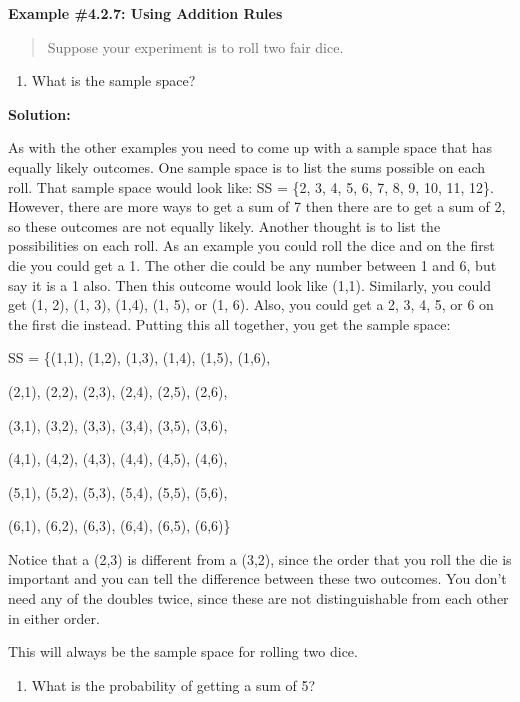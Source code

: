 \documentclass[]{book}
\providecommand{\tightlist}{%
  \setlength{\itemsep}{0pt}\setlength{\parskip}{0pt}}
\begin{document}
\textbf{Example \#4.2.7: Using Addition Rules}

\begin{quote}
Suppose your experiment is to roll two fair dice.
\end{quote}

\begin{enumerate}
\def\labelenumi{\alph{enumi}.}
\tightlist
\item
  What is the sample space?
\end{enumerate}

\textbf{Solution:}

As with the other examples you need to come up with a sample space
that has equally likely outcomes. One sample space is to list the
sums possible on each roll. That sample space would look like: SS =
\{2, 3, 4, 5, 6, 7, 8, 9, 10, 11, 12\}. However, there are more ways
to get a sum of 7 then there are to get a sum of 2, so these
outcomes are not equally likely. Another thought is to list the
possibilities on each roll. As an example you could roll the dice
and on the first die you could get a 1. The other die could be any
number between 1 and 6, but say it is a 1 also. Then this outcome
would look like (1,1). Similarly, you could get (1, 2), (1, 3),
(1,4), (1, 5), or (1, 6). Also, you could get a 2, 3, 4, 5, or 6 on
the first die instead. Putting this all together, you get the sample
space:

SS = \{(1,1), (1,2), (1,3), (1,4), (1,5), (1,6),

(2,1), (2,2), (2,3), (2,4), (2,5), (2,6),

(3,1), (3,2), (3,3), (3,4), (3,5), (3,6),

(4,1), (4,2), (4,3), (4,4), (4,5), (4,6),

(5,1), (5,2), (5,3), (5,4), (5,5), (5,6),

(6,1), (6,2), (6,3), (6,4), (6,5), (6,6)\}

Notice that a (2,3) is different from a (3,2), since the order that
you roll the die is important and you can tell the difference
between these two outcomes. You don't need any of the doubles twice,
since these are not distinguishable from each other in either order.

This will always be the sample space for rolling two dice.

\begin{enumerate}
\def\labelenumi{\alph{enumi}.}
\setcounter{enumi}{1}
\tightlist
\item
  What is the probability of getting a sum of 5?
\end{enumerate}
\end{document}
